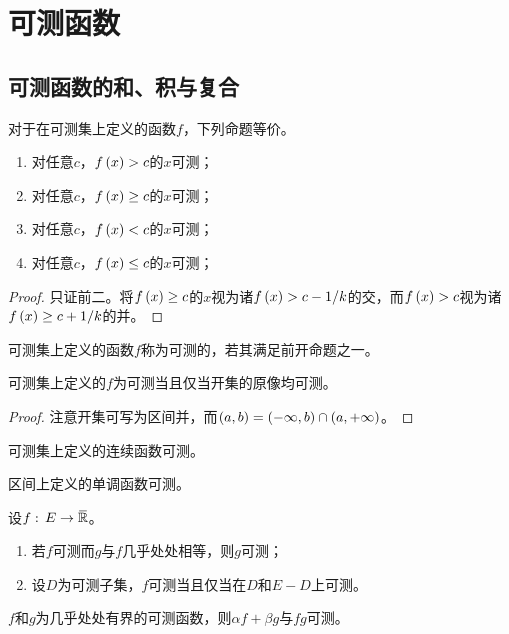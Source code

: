 \documentclass{ctexrep}
\begin{document}
  \section{可测函数}
  \subsection{可测函数的和、积与复合}
  \begin{proposition}
    对于在可测集上定义的函数$f$，下列命题等价。
    \begin{enumerate}
      \item 对任意$c$，$f\left(x\right)>c$的$x$可测；
      \item 对任意$c$，$f\left(x\right)\ge c$的$x$可测；
      \item 对任意$c$，$f\left(x\right)<c$的$x$可测；
      \item 对任意$c$，$f\left(x\right)\le c$的$x$可测；
    \end{enumerate}
  \end{proposition}
  \begin{proof}
    只证前二。将$f\left(x\right)\ge c$的$x$视为诸$f\left(x\right)>c-1/k$的交，而$f\left(x\right)>c$视为诸$f\left(x\right)\ge c+1/k$的并。
  \end{proof}
  \begin{definition}
    可测集上定义的函数$f$称为可测的，若其满足前开命题之一。
  \end{definition}
  \begin{proposition}
    可测集上定义的$f$为可测当且仅当开集的原像均可测。
  \end{proposition}
  \begin{proof}
    注意开集可写为区间并，而$\left(a,b\right)=\left(-\infty,b\right)\cap\left(a,+\infty\right)$。
  \end{proof}
  \begin{proposition}
    可测集上定义的连续函数可测。
  \end{proposition}
  \begin{proposition}
    区间上定义的单调函数可测。
  \end{proposition}
  \begin{proposition}
    设$\func{f}{E}{\clo{\R}}$。
    \begin{enumerate}
      \item 若$f$可测而$g$与$f$几乎处处相等，则$g$可测；
      \item 设$D$为可测子集，$f$可测当且仅当在$D$和$E-D$上可测。
    \end{enumerate}
  \end{proposition}
  \begin{theorem}
    $f$和$g$为几乎处处有界的可测函数，则$ \alpha f + \beta g $与$ fg $可测。
  \end{theorem}
\end{document}

